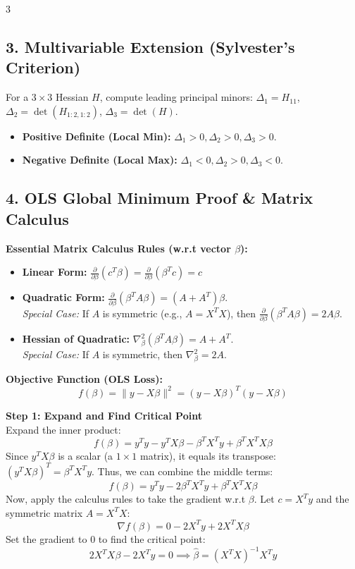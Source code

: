\documentclass[10pt,landscape]{article}
\begin{document}
\begin{multicols*}{3}
\subsection*{3. Multivariable Extension (Sylvester's Criterion)}
For a $3 \times 3$ Hessian $H$, compute leading principal minors: $\Delta_1 = H_{11}$, $\Delta_2 = \det(H_{1:2, 1:2})$, $\Delta_3 = \det(H)$.
\begin{itemize}
    \item \textbf{Positive Definite (Local Min):} $\Delta_1 > 0, \Delta_2 > 0, \Delta_3 > 0$.
    \item \textbf{Negative Definite (Local Max):} $\Delta_1 < 0, \Delta_2 > 0, \Delta_3 < 0$.
\end{itemize}

\subsection*{4. OLS Global Minimum Proof \& Matrix Calculus}

\textbf{Essential Matrix Calculus Rules (w.r.t vector $\beta$):}
\begin{itemize}
    \item \textbf{Linear Form:} $\frac{\partial}{\partial \beta} (c^T \beta) = \frac{\partial}{\partial \beta} (\beta^T c) = c$
    \item \textbf{Quadratic Form:} $\frac{\partial}{\partial \beta} (\beta^T A \beta) = (A + A^T)\beta$. \\
    \textit{Special Case:} If $A$ is symmetric (e.g., $A = X^TX$), then $\frac{\partial}{\partial \beta} (\beta^T A \beta) = 2A\beta$.
    \item \textbf{Hessian of Quadratic:} $\nabla^2_\beta (\beta^T A \beta) = A + A^T$. \\
    \textit{Special Case:} If $A$ is symmetric, then $\nabla^2_\beta = 2A$.
\end{itemize}

\textbf{Objective Function (OLS Loss):}
$$f(\beta) = \|y - X\beta\|^2 = (y - X\beta)^T(y - X\beta)$$

\textbf{Step 1: Expand and Find Critical Point} \\
Expand the inner product:
$$f(\beta) = y^Ty - y^TX\beta - \beta^TX^Ty + \beta^TX^TX\beta$$
Since $y^TX\beta$ is a scalar (a $1 \times 1$ matrix), it equals its transpose: $(y^TX\beta)^T = \beta^TX^Ty$. Thus, we can combine the middle terms:
$$f(\beta) = y^Ty - 2\beta^TX^Ty + \beta^TX^TX\beta$$
Now, apply the calculus rules to take the gradient w.r.t $\beta$. Let $c = X^Ty$ and the symmetric matrix $A = X^TX$:
$$\nabla f(\beta) = 0 - 2X^Ty + 2X^TX\beta$$
Set the gradient to 0 to find the critical point:
$$2X^TX\beta - 2X^Ty = 0 \implies \hat{\beta} = (X^TX)^{-1}X^Ty$$


\end{multicols*}
\end{document}
